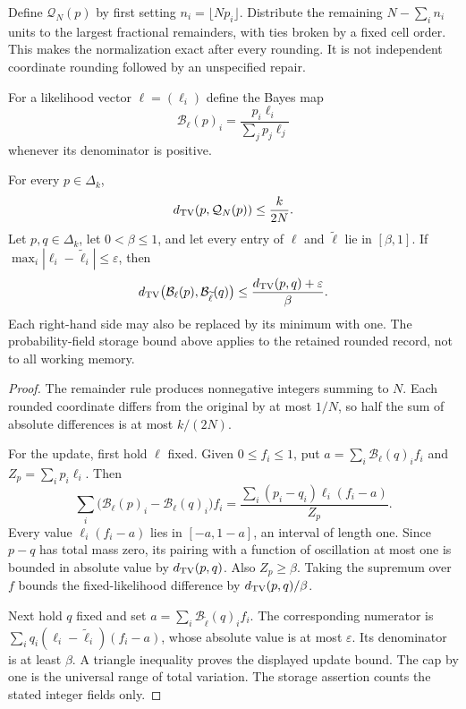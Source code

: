 Define $\mathcal Q_N(p)$ by first setting $n_i=\lfloor Np_i\rfloor$. Distribute the remaining $N-\sum_i n_i$ units to the largest fractional remainders, with ties broken by a fixed cell order. This makes the normalization exact after every rounding. It is not independent coordinate rounding followed by an unspecified repair.

For a likelihood vector $\ell=(\ell_i)$ define the Bayes map
\[
 \mathcal B_\ell(p)_i=\frac{p_i\ell_i}{\sum_jp_j\ell_j}
\]
whenever its denominator is positive.

\begin{GAproposition}\label{GA:prop:roundbayes}
For every $p\in\Delta_k$,
\[
 d_{\mathrm{TV}}(p,\mathcal Q_N(p))\le\frac{k}{2N}.
\]
Let $p,q\in\Delta_k$, let $0<\beta\le1$, and let every entry of $\ell$ and $\widetilde\ell$ lie in $[\beta,1]$. If $\max_i|\ell_i-\widetilde\ell_i|\le\varepsilon$, then
\[
 d_{\mathrm{TV}}\bigl(\mathcal B_\ell(p),\mathcal B_{\widetilde\ell}(q)\bigr)
 \le \frac{d_{\mathrm{TV}}(p,q)+\varepsilon}{\beta}.
\]
Each right-hand side may also be replaced by its minimum with one. The probability-field storage bound above applies to the retained rounded record, not to all working memory.
\end{GAproposition}
\begin{proof}
The remainder rule produces nonnegative integers summing to $N$. Each rounded coordinate differs from the original by at most $1/N$, so half the sum of absolute differences is at most $k/(2N)$.

For the update, first hold $\ell$ fixed. Given $0\le f_i\le1$, put $a=\sum_i\mathcal B_\ell(q)_if_i$ and $Z_p=\sum_ip_i\ell_i$. Then
\[
 \sum_i\bigl(\mathcal B_\ell(p)_i-\mathcal B_\ell(q)_i\bigr)f_i
 =\frac{\sum_i(p_i-q_i)\ell_i(f_i-a)}{Z_p}.
\]
Every value $\ell_i(f_i-a)$ lies in $[-a,1-a]$, an interval of length one. Since $p-q$ has total mass zero, its pairing with a function of oscillation at most one is bounded in absolute value by $d_{\mathrm{TV}}(p,q)$. Also $Z_p\ge\beta$. Taking the supremum over $f$ bounds the fixed-likelihood difference by $d_{\mathrm{TV}}(p,q)/\beta$.

Next hold $q$ fixed and set $a=\sum_i\mathcal B_{\widetilde\ell}(q)_if_i$. The corresponding numerator is $\sum_iq_i(\ell_i-\widetilde\ell_i)(f_i-a)$, whose absolute value is at most $\varepsilon$. Its denominator is at least $\beta$. A triangle inequality proves the displayed update bound. The cap by one is the universal range of total variation. The storage assertion counts the stated integer fields only.
\end{proof}

